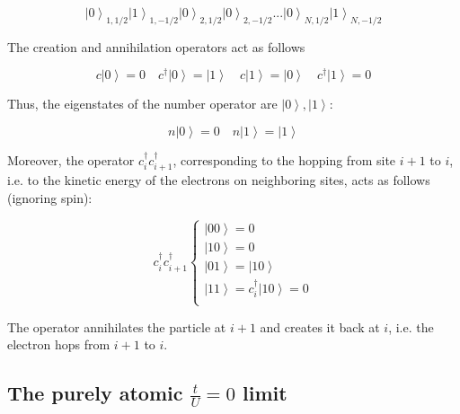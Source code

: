 \documentclass[10pt, twocolumn, twoside]{article}
\begin{document}
\begin{equation}
\left| 0 \right\rangle_{1, 1/2} \left| 1 \right\rangle_{1, -1/2} \left| 0 \right\rangle_{2, 1/2} \left| 0 \right\rangle_{2, -1/2} ... \left| 0 \right\rangle_{N, 1/2} \left| 1 \right\rangle_{N, -1/2} 
\end{equation}

The creation and annihilation operators act as follows

\begin{equation}
c \left| 0 \right\rangle = 0 \quad c^\dagger \left| 0 \right\rangle = \left| 1 \right\rangle \quad c \left| 1 \right\rangle = \left| 0 \right\rangle \quad c^\dagger \left| 1 \right\rangle = 0
\end{equation}

Thus, the eigenstates of the number operator are $\left| 0 \right\rangle, \left| 1 \right\rangle$:

\begin{equation}
n \left| 0 \right\rangle = 0 \quad n \left| 1 \right\rangle = \left| 1 \right\rangle
\end{equation}

Moreover, the operator $c_i^\dagger c_{i+1}^\dagger$, corresponding to the hopping from site $i+1$ to $i$, i.e. to the kinetic energy of the electrons on neighboring sites, acts as follows (ignoring spin):

\begin{equation}
c_i^\dagger c_{i+1}^\dagger \begin{cases}
\left|0 0 \right\rangle = 0 \\
\left|1 0 \right\rangle =  0 \\
\left|0 1 \right\rangle =  \left| 1 0 \right\rangle \\
\left|1 1 \right\rangle =  c_i^\dagger \left| 1 0  \right\rangle = 0 \\
\end{cases}
\end{equation}

The operator annihilates the particle at $i+1$ and creates it back at $i$, i.e. the electron hops from $i+1$ to $i$.

\subsection{The purely atomic $\frac{t}{U} = 0$ limit}\paragraph{}
\end{document}
